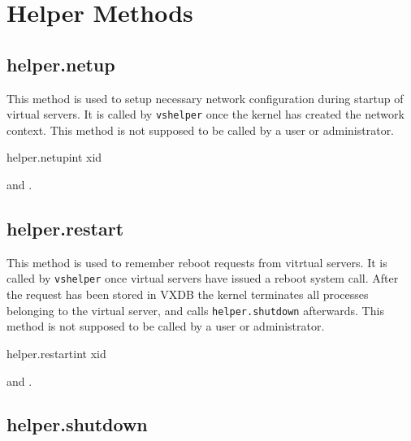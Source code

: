 \chapter{Helper Methods}


\section{helper.netup}

This method is used to setup necessary network configuration during startup of
virtual servers. It is called by \texttt{vshelper} once the kernel has created
the network context. This method is not supposed to be called by a user or
administrator.

\begin{rpcsynopsis}{helper.netup}{int xid}
\end{rpcsynopsis}

\begin{rpcaccess}
 and \rpcnoownerchecks.
\end{rpcaccess}

\rpcreturnnil

\rpcnoerrors


\section{helper.restart}

This method is used to remember reboot requests from vitrtual servers. It is
called by \texttt{vshelper} once virtual servers have issued a reboot system
call. After the request has been stored in VXDB the kernel terminates all
processes belonging to the virtual server, and calls \texttt{helper.shutdown}
afterwards.  This method is not supposed to be called by a user or
administrator.

\begin{rpcsynopsis}{helper.restart}{int xid}
\end{rpcsynopsis}

\begin{rpcaccess}
 and \rpcnoownerchecks.
\end{rpcaccess}

\rpcreturnnil

\rpcnoerrors


\section{helper.shutdown}


